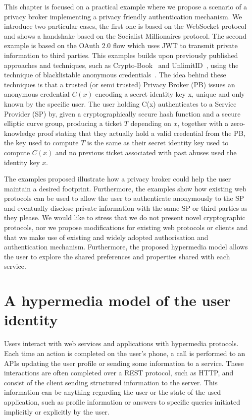 This chapter is focused on a practical example where we propose a scenario of a privacy broker implementing a privacy friendly authentication mechanism. We introduce two particular cases, the first one is based on the WebSocket protocol and shows a handshake based on the Socialist Millionaires protocol. The second example is based on the OAuth 2.0 flow which uses JWT to transmit private information to third parties. This examples builds upon previously published approaches and techniques, such as Crypto-Book~\cite{maheswaran2013crypto} and UnlimitID~\cite{isaakidis2016unlimitid}, using the technique of blacklistable anonymous credentials~\cite{tsang2007blacklistable}. The idea behind these techniques is that a trusted (or semi trusted) Privacy Broker (PB) issues an anonymous credential $C(x)$ encoding a secret identity key x, unique and only known by the specific user. The user holding C(x) authenticates to a Service Provider (SP) by, given a cryptographically secure hash function and a secure elliptic curve group, producing a ticket $T$ depending on $x$, together with a zero-knowledge proof stating that they actually hold a valid credential from the PB, the key used to compute $T$ is the same as their secret identity key used to compute $C(x)$ and no previous ticket associated with past abuses used the identity key $x$. 

The examples proposed illustrate how a privacy broker could help the user maintain a desired footprint. Furthermore, the examples show how existing web protocols can be used to allow the user to authenticate anonymously to the SP and eventually disclose private information with the same SP or third-parties as they please. We would like to stress that we do not present novel cryptographic protocols, nor we propose modifications for existing web protocols or clients and that we make use of existing and widely adopted authorisation and authentication mechanism. Furthermore, the proposed hypermedia model allows the user to explore the shared preferences and properties shared with each service.

\section{A hypermedia model of the user identity}

Users interact with web services and applications with hypermedia protocols. Each time an action is completed on the user's phone, a call is performed to an APIs updating the user profile or sending some information to a service. These interactions are often completed over a REST protocol, such as HTTP, and consist of the client sending structured information to the server. This information can be anything regarding the user or the state of the used application, such as profile information or answers to specific queries initiated implicitly or explicitly by the user.

